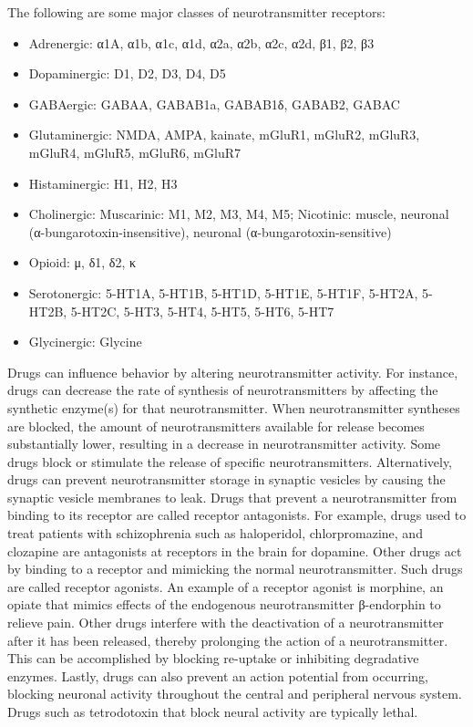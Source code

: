 \documentclass[]{book}
\providecommand{\tightlist}{%
  \setlength{\itemsep}{0pt}\setlength{\parskip}{0pt}}
\begin{document}
The following are some major classes of neurotransmitter receptors:

\begin{itemize}
\tightlist
\item
  Adrenergic: α1A, α1b, α1c, α1d, α2a, α2b, α2c, α2d, β1, β2, β3
\item
  Dopaminergic: D1, D2, D3, D4, D5
\item
  GABAergic: GABAA, GABAB1a, GABAB1δ, GABAB2, GABAC
\item
  Glutaminergic: NMDA, AMPA, kainate, mGluR1, mGluR2, mGluR3, mGluR4, mGluR5, mGluR6, mGluR7
\item
  Histaminergic: H1, H2, H3
\item
  Cholinergic: Muscarinic: M1, M2, M3, M4, M5; Nicotinic: muscle, neuronal (α-bungarotoxin-insensitive), neuronal (α-bungarotoxin-sensitive)
\item
  Opioid: μ, δ1, δ2, κ
\item
  Serotonergic: 5-HT1A, 5-HT1B, 5-HT1D, 5-HT1E, 5-HT1F, 5-HT2A, 5-HT2B, 5-HT2C, 5-HT3, 5-HT4, 5-HT5, 5-HT6, 5-HT7
\item
  Glycinergic: Glycine
\end{itemize}

Drugs can influence behavior by altering neurotransmitter activity. For instance, drugs can decrease the rate of synthesis of neurotransmitters by affecting the synthetic enzyme(s) for that neurotransmitter. When neurotransmitter syntheses are blocked, the amount of neurotransmitters available for release becomes substantially lower, resulting in a decrease in neurotransmitter activity. Some drugs block or stimulate the release of specific neurotransmitters. Alternatively, drugs can prevent neurotransmitter storage in synaptic vesicles by causing the synaptic vesicle membranes to leak. Drugs that prevent a neurotransmitter from binding to its receptor are called receptor antagonists. For example, drugs used to treat patients with schizophrenia such as haloperidol, chlorpromazine, and clozapine are antagonists at receptors in the brain for dopamine. Other drugs act by binding to a receptor and mimicking the normal neurotransmitter. Such drugs are called receptor agonists. An example of a receptor agonist is morphine, an opiate that mimics effects of the endogenous neurotransmitter β-endorphin to relieve pain. Other drugs interfere with the deactivation of a neurotransmitter after it has been released, thereby prolonging the action of a neurotransmitter. This can be accomplished by blocking re-uptake or inhibiting degradative enzymes. Lastly, drugs can also prevent an action potential from occurring, blocking neuronal activity throughout the central and peripheral nervous system. Drugs such as tetrodotoxin that block neural activity are typically lethal.
\end{document}
